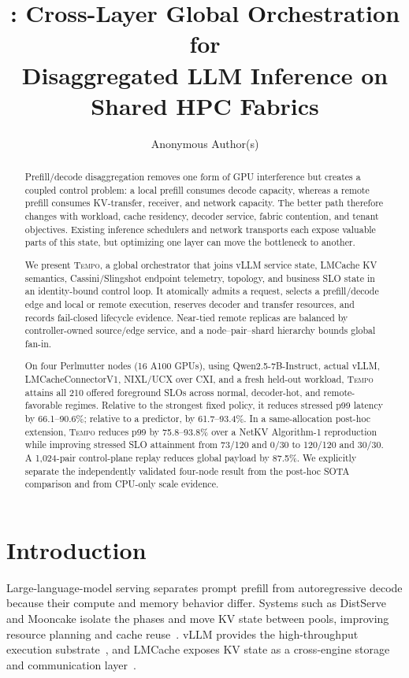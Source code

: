 \documentclass[10pt,twocolumn]{article}
\title{\system: Cross-Layer Global Orchestration for\\
Disaggregated LLM Inference on Shared HPC Fabrics}
\author{Anonymous Author(s)}
\date{}
\newcommand{\system}{\textsc{Tempo}\xspace}
\begin{document}
\maketitle

\begin{abstract}
Prefill/decode disaggregation removes one form of GPU interference but creates
a coupled control problem: a local prefill consumes decode capacity, whereas a
remote prefill consumes KV-transfer, receiver, and network capacity.  The
better path therefore changes with workload, cache residency, decoder service,
fabric contention, and tenant objectives.  Existing inference schedulers and
network transports each expose valuable parts of this state, but optimizing one
layer can move the bottleneck to another.

We present \system, a global orchestrator that joins vLLM service state,
LMCache KV semantics, Cassini/Slingshot endpoint telemetry, topology, and
business SLO state in an identity-bound control loop.  It atomically admits a
request, selects a prefill/decode edge and local or remote execution, reserves
decoder and transfer resources, and records fail-closed lifecycle evidence.
Near-tied remote replicas are balanced by controller-owned source/edge service,
and a node--pair--shard hierarchy bounds global fan-in.

On four Perlmutter nodes (16 A100 GPUs), using Qwen2.5-7B-Instruct, actual
vLLM, LMCacheConnectorV1, NIXL/UCX over CXI, and a fresh held-out workload,
\system attains all 210 offered foreground SLOs across normal, decoder-hot, and
remote-favorable regimes.  Relative to the strongest fixed policy, it reduces
stressed p99 latency by 66.1--90.6\%; relative to a predictor, by 61.7--93.4\%.
In a same-allocation post-hoc extension, \system reduces p99 by 75.8--93.8\%
over a NetKV Algorithm-1 reproduction while improving stressed SLO attainment
from 73/120 and 0/30 to 120/120 and 30/30.  A 1,024-pair control-plane replay
reduces global payload by 87.5\%.  We explicitly separate the independently
validated four-node result from the post-hoc SOTA comparison and from
CPU-only scale evidence.
\end{abstract}

\section{Introduction}

Large-language-model serving separates prompt prefill from autoregressive
decode because their compute and memory behavior differ.  Systems such as
DistServe and Mooncake isolate the phases and move KV state between pools,
improving resource planning and cache reuse~\cite{distserve,mooncake}.  vLLM
provides the high-throughput execution substrate~\cite{vllm}, and LMCache
exposes KV state as a cross-engine storage and communication layer~\cite{lmcache}.
\end{document}
